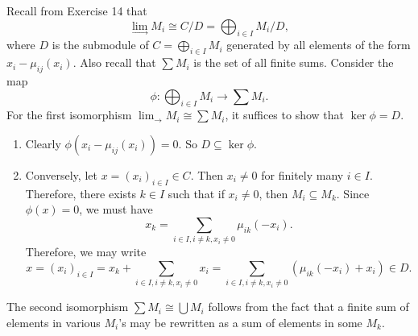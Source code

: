 \documentclass[10pt]{amsart}
\begin{document}

\begin{exercise}[Exercise 17]
\end{exercise}

\begin{solution}
    Recall from Exercise 14 that 
    \[\lim_{\to} M_i \cong C/D = \bigoplus_{i \in I}M_i/D,\]
    where $D$ is the submodule of $C = \bigoplus_{i \in I}M_i$ generated by all elements of the form $x_i - \mu_{ij}(x_i)$. Also recall that $\sum M_i$ is the set of all finite sums.
    Consider the map 
    \[\phi: \bigoplus_{i \in I}M_i \to \sum M_i.\]
    For the first isomorphism $\lim_{\to} M_i \cong \sum M_i$, it suffices to show that $\ker \phi  = D$. 
    \begin{enumerate}
        \item Clearly $\phi(x_i - \mu_{ij}(x_i)) = 0$. So $D \subseteq \ker \phi$.
        \item Conversely, let $x = (x_i)_{i \in I} \in C$. Then $x_i \neq 0$ for finitely many $i \in I$. Therefore, there exists $k \in I$ such that if $x_i \neq 0$, then $M_i \subseteq M_k$. Since $\phi(x) = 0$, we must have
        \[
        x_k = \sum_{i \in I, i \neq k, x_i \neq 0}\mu_{ik}(-x_i).
        \]
        Therefore, we may write 
        \[
        x = (x_i)_{i \in I} = x_k + \sum_{i \in I, i \neq k, x_i \neq 0}x_i = \sum_{i \in I, i \neq k, x_i \neq 0} (\mu_{ik}(-x_i) + x_i) \in D.
        \]
    \end{enumerate}

    The second isomorphism $\sum M_i \cong \bigcup M_i$ follows from the fact that a finite sum of elements in various $M_i$'s may be rewritten as a sum of elements in some $M_k$.

\end{solution}
\end{document}
